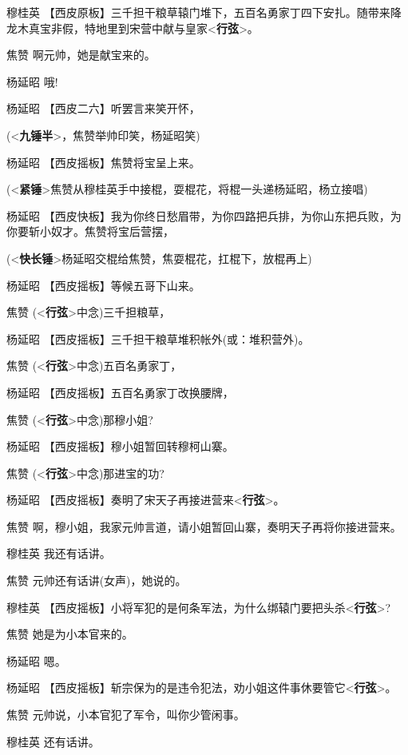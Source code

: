 穆桂英
【西皮原板】三千担干粮草辕门堆下，五百名勇家丁四下安扎。随带来降龙木真宝非假，特地里到宋营中献与皇家\textless{}\textbf{行弦}\textgreater{}。

焦赞 啊元帅，她是献宝来的。

杨延昭 哦!

杨延昭 【西皮二六】听罢言来笑开怀，

(\textless{}\textbf{九锤半}\textgreater{}，焦赞举帅印笑，杨延昭笑)

杨延昭 【西皮摇板】焦赞将宝呈上来。

(\textless{}\textbf{紧锤}\textgreater{}焦赞从穆桂英手中接棍，耍棍花，将棍一头递杨延昭，杨立接唱)

杨延昭
【西皮快板】我为你终日愁眉带，为你四路把兵排，为你山东把兵败，为你要斩小奴才。焦赞将宝后营摆，

(\textless{}\textbf{快长锤}\textgreater{}杨延昭交棍给焦赞，焦耍棍花，扛棍下，放棍再上)

杨延昭 【西皮摇板】等候五哥下山来。

焦赞 (\textless{}\textbf{行弦}\textgreater{}中念)三千担粮草，

杨延昭 【西皮摇板】三千担干粮草堆积帐外(或：堆积营外)。

焦赞 (\textless{}\textbf{行弦}\textgreater{}中念)五百名勇家丁，

杨延昭 【西皮摇板】五百名勇家丁改换腰牌，

焦赞 (\textless{}\textbf{行弦}\textgreater{}中念)那穆小姐?

杨延昭 【西皮摇板】穆小姐暂回转穆柯山寨。

焦赞 (\textless{}\textbf{行弦}\textgreater{}中念)那进宝的功?

杨延昭
【西皮摇板】奏明了宋天子再接进营来\textless{}\textbf{行弦}\textgreater{}。

焦赞 啊，穆小姐，我家元帅言道，请小姐暂回山寨，奏明天子再将你接进营来。

穆桂英 我还有话讲。

焦赞 元帅还有话讲(女声)，她说的。

穆桂英
【西皮摇板】小将军犯的是何条军法，为什么绑辕门要把头杀\textless{}\textbf{行弦}\textgreater{}?

焦赞 她是为小本官来的。

杨延昭 嗯。

杨延昭
【西皮摇板】斩宗保为的是违令犯法，劝小姐这件事休要管它\textless{}\textbf{行弦}\textgreater{}。

焦赞 元帅说，小本官犯了军令，叫你少管闲事。

穆桂英 还有话讲。


